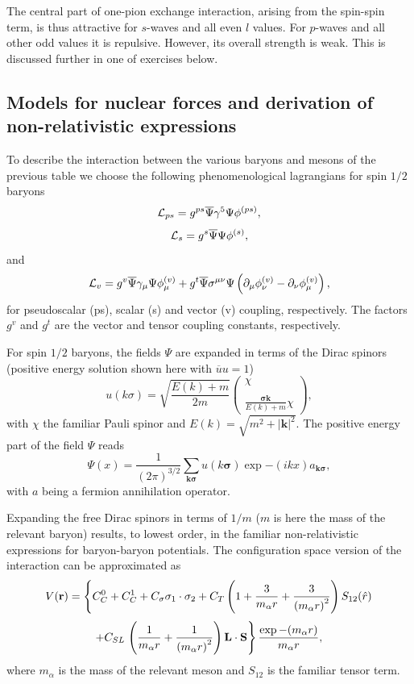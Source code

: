 \documentclass[%
oneside,                 %
final,                   %
10pt]{article}
\begin{document}
The central part of one-pion exchange interaction, arising from the spin-spin term,  
is thus attractive for $s$-waves and all even $l$ values. For $p$-waves and all other odd values
it is repulsive. However, its overall strength is weak. This is discussed further in one of exercises below.


\subsection{Models for nuclear forces and derivation of non-relativistic expressions}
To describe the interaction between the various baryons and mesons of the previous
table we choose the following phenomenological
lagrangians
for spin $1/2$ baryons
\[
   {\cal L}_{ps} =g^{ps}\overline{\Psi}\gamma^{5}
   \Psi\phi^{(ps)},
\]
\[
   {\cal L}_{s} =g^{s}\overline{\Psi}\Psi\phi^{(s)},
\]
and
\[
   {\cal L}_{v} =g^{v}\overline{\Psi}\gamma_{\mu}\Psi\phi_{\mu}^{(v)}
   +g^{t}\overline{\Psi}\sigma^{\mu\nu}\Psi\left
   (\partial_{\mu}\phi_{\nu}^{(v)}
   -\partial_{\nu}\phi_{\mu}^{(v)}\right),
\]
for pseudoscalar (ps), scalar (s) and vector (v) coupling, respectively.
The factors $g^{v}$ and $g^{t}$ are the vector
and tensor coupling constants, respectively.

For spin $1/2$ baryons, the fields $\Psi$ are expanded
in terms of the Dirac spinors (positive energy
solution shown here with $\overline{u}u=1$)
\[
   u(k\sigma)=\sqrt{\frac{E(k)+m}{2m}}
	  \left(\begin{array}{c} \chi\\ \\
	  \frac{\mathbf{\sigma}\mathbf{k}}{E(k)+m}\chi
	  \end{array}\right), 
\]
with $\chi$ the familiar Pauli spinor and $E(k) =\sqrt{m^2 +|\mathbf{k}|^2}$. 
The positive energy part of the field $\Psi$ reads
\[
\Psi (x)={\displaystyle \frac{1}{(2\pi )^{3/2}}
        \sum_{\mathbf{k}\mathbf{\sigma}}u(k\mathbf{\sigma})\exp{-(ikx)}a_{\mathbf{k}\mathbf{\sigma}}},
\]
with $a$ being a fermion annihilation operator.

Expanding the free Dirac spinors
in terms of $1/m$ ($m$ is here the mass of the relevant baryon) 
results, to lowest order, in the familiar non-relativistic
expressions for baryon-baryon potentials.
The configuration space version of the interaction can be approximated as
\[
V(\mathbf{r})= \left\{ C^0_C + C^1_C + C_\sigma 
\mathbf{\sigma}_1\cdot\mathbf{\sigma}_2
 + C_T \left( 1 + {3\over m_\alpha r} + {3\over
\left(m_\alpha r\right)^2}
\right) S_{12} (\hat r)\right.
\]
\[
+ C_{SL}\left. \left( {1\over m_\alpha r} + {1\over \left( m_\alpha r\right)^2}
\right) \mathbf{L}\cdot \mathbf{S}
\right\} \frac{\exp{-(m_\alpha r)}}{m_\alpha r},
\]
where $m_{\alpha}$ is the mass of the relevant meson and
$S_{12}$ is the familiar tensor term.
\end{document}

